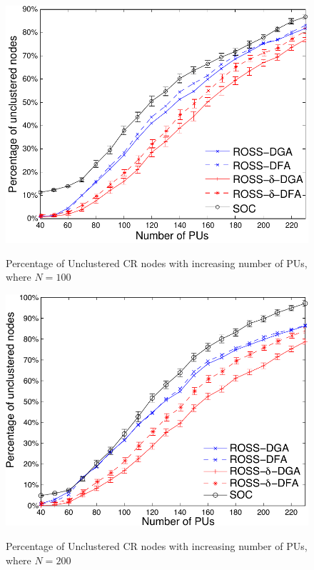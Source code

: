\documentclass[times]{ettauth}
\theoremstyle{mytheoremstyle}
\theoremstyle{mytheoremstyle}
\theoremstyle{mytheoremstyle}
\begin{document}
\begin{figure}[t]
\begin{multicols}{3}
    \includegraphics[width=\linewidth]{survival_rate_100_edge50.pdf}\par\caption{Percentage of Unclustered CR nodes with increasing number of PUs, where $N=100$}\label{singleton_clusters_100}
    \includegraphics[width=\linewidth]{survival_rate_200_edge50.pdf}\par\caption{Percentage of Unclustered CR nodes with increasing number of PUs, where $N=200$}\label{singleton_clusters_200}

\end{multicols}
\end{figure}
\end{document}
